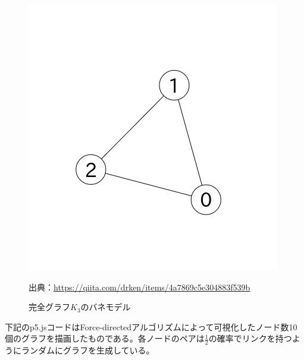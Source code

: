 \documentclass[dvipdfmx]{jsarticle}
\begin{document}
\begin{figure}[H]
  \centering
  \includegraphics[scale=0.4]{images/K3result.png}
  \caption{完全グラフ$K_{3}$のバネモデル}
  出典：\url{https://qiita.com/drken/items/4a7869c5e304883f539b}
\end{figure}
下記のp5.jsコードはForce-directedアルゴリズムによって可視化したノード数10個のグラフを描画したものである。各ノードのペアは$\frac{1}{2}$の確率でリンクを持つようにランダムにグラフを生成している。
\end{document}
